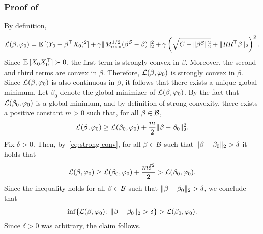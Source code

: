 \subsubsection{Proof of }
By definition,
\begin{align*}
    \mathcal{L}(\beta, \varphi_0) = \mathbb{E}\,[(Y_0 - \beta^\top X_0)^2]
    + \gamma \|M_{\mathrm{seen}}^{1/2}(\beta^{\mathcal{S}} - \beta)\|_2^2
      + \gamma \left(\sqrt{C - \|\beta^{\mathcal{S}}\|_2^2}  + \|RR^\top \beta\|_2\right)^2.
\end{align*}
Since $\mathbb{E}\,[X_0X_0^\top] \succ 0$, the first term is strongly convex in $\beta$.
Moreover, the second and third terms are convex in $\beta$. Therefore, $\mathcal{L}(\beta, \varphi_0)$ is strongly convex in $\beta$. Since $\mathcal{L}(\beta, \varphi_0)$ is also continuous in $\beta$, it follows that there exists a unique global minimum. Let $\beta_0$ denote the global minimizer of $\mathcal{L}(\beta, \varphi_0)$.
By the fact that $\mathcal{L}(\beta_0, \varphi_0)$ is a global  minimum, and by definition of strong convexity, there exists a positive constant $m > 0$ such that, for all $\beta \in \mathcal{B}$,
\begin{align}\label{eq:strong-conv}
    \mathcal{L}(\beta, \varphi_0) \geq \mathcal{L}(\beta_0, \varphi_0) + \frac{m}{2} \|\beta - \beta_0\|_2^2.
\end{align}
Fix $\delta > 0$.  
Then, by~\eqref{eq:strong-conv},  for all $\beta \in \mathcal{B}$ such that $\|\beta-\beta_0\|_2 > \delta$ it holds that
\begin{align*}
    \mathcal{L}(\beta, \varphi_0) \geq \mathcal{L}(\beta_0, \varphi_0) + \frac{m\delta^2}{2} > \mathcal{L}(\beta_0, \varphi_0). 
\end{align*}
Since the inequality holds for all $\beta \in \mathcal{B}$ such that $\|\beta-\beta_0\|_2 > \delta$, we conclude that
\begin{align*}
    \inf \{\mathcal{L}(\beta, \varphi_0)  \colon \|\beta-\beta_0\|_2 > \delta\} > \mathcal{L}(\beta_0, \varphi_0).
\end{align*}
Since $\delta > 0$ was arbitrary, the claim follows.

